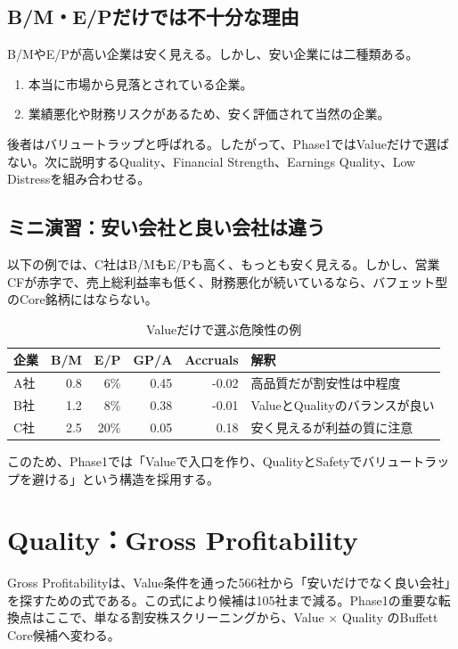 \documentclass[11pt,a4paper]{article}
\begin{document}
\subsection{B/M・E/Pだけでは不十分な理由}

B/MやE/Pが高い企業は安く見える。しかし、安い企業には二種類ある。

\begin{enumerate}[leftmargin=2em]
\item 本当に市場から見落とされている企業。
\item 業績悪化や財務リスクがあるため、安く評価されて当然の企業。
\end{enumerate}

後者はバリュートラップと呼ばれる。したがって、Phase1ではValueだけで選ばない。次に説明するQuality、Financial Strength、Earnings Quality、Low Distressを組み合わせる。

\subsection{ミニ演習：安い会社と良い会社は違う}

以下の例では、C社はB/MもE/Pも高く、もっとも安く見える。しかし、営業CFが赤字で、売上総利益率も低く、財務悪化が続いているなら、バフェット型のCore銘柄にはならない。

\begin{table}[tbp]
\caption{Valueだけで選ぶ危険性の例}
\label{tab:value-trap}
\centering
\small
\begin{tabular}{lrrrrl}
\toprule
企業 & B/M & E/P & GP/A & Accruals & 解釈 \\
\midrule
A社 & 0.8 & 6\% & 0.45 & -0.02 & 高品質だが割安性は中程度 \\
B社 & 1.2 & 8\% & 0.38 & -0.01 & ValueとQualityのバランスが良い \\
C社 & 2.5 & 20\% & 0.05 & 0.18 & 安く見えるが利益の質に注意 \\
\bottomrule
\end{tabular}
\end{table}

このため、Phase1では「Valueで入口を作り、QualityとSafetyでバリュートラップを避ける」という構造を採用する。


\clearpage
\section{Quality：Gross Profitability}
\begin{keybox}
Gross Profitabilityは、Value条件を通った566社から「安いだけでなく良い会社」を探すための式である。この式により候補は105社まで減る。Phase1の重要な転換点はここで、単なる割安株スクリーニングから、Value × Quality のBuffett Core候補へ変わる。
\end{keybox}
\end{document}
